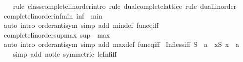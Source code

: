 \begin{isabellebody}
\ \ %
\endisadelimproof
%
\isatagproof
{}\isamarkupfalse%
\ {\isacharparenleft}{\kern0pt}rule\ class{\isachardot}{\kern0pt}complete{\isacharunderscore}{\kern0pt}linorder{\isachardot}{\kern0pt}intro{\isacharcomma}{\kern0pt}\ rule\ dual{\isacharunderscore}{\kern0pt}complete{\isacharunderscore}{\kern0pt}lattice{\isacharcomma}{\kern0pt}\ rule\ dual{\isacharunderscore}{\kern0pt}linorder{\isacharparenright}{\kern0pt}%
\endisatagproof
{\isafoldproof}%
%
\isadelimproof
\isanewline
%
\endisadelimproof
\isanewline
{}\isamarkupfalse%
\ complete{\isacharunderscore}{\kern0pt}linorder{\isacharunderscore}{\kern0pt}inf{\isacharunderscore}{\kern0pt}min{\isacharcolon}{\kern0pt}\ {\isachardoublequoteopen}inf\ {\isacharequal}{\kern0pt}\ min{\isachardoublequoteclose}\isanewline
%
\isadelimproof
\ \ %
\endisadelimproof
%
\isatagproof
{}\isamarkupfalse%
\ {\isacharparenleft}{\kern0pt}auto\ intro{\isacharcolon}{\kern0pt}\ order{\isachardot}{\kern0pt}antisym\ simp\ add{\isacharcolon}{\kern0pt}\ min{\isacharunderscore}{\kern0pt}def\ fun{\isacharunderscore}{\kern0pt}eq{\isacharunderscore}{\kern0pt}iff{\isacharparenright}{\kern0pt}%
\endisatagproof
{\isafoldproof}%
%
\isadelimproof
\isanewline
%
\endisadelimproof
\isanewline
{}\isamarkupfalse%
\ complete{\isacharunderscore}{\kern0pt}linorder{\isacharunderscore}{\kern0pt}sup{\isacharunderscore}{\kern0pt}max{\isacharcolon}{\kern0pt}\ {\isachardoublequoteopen}sup\ {\isacharequal}{\kern0pt}\ max{\isachardoublequoteclose}\isanewline
%
\isadelimproof
\ \ %
\endisadelimproof
%
\isatagproof
{}\isamarkupfalse%
\ {\isacharparenleft}{\kern0pt}auto\ intro{\isacharcolon}{\kern0pt}\ order{\isachardot}{\kern0pt}antisym\ simp\ add{\isacharcolon}{\kern0pt}\ max{\isacharunderscore}{\kern0pt}def\ fun{\isacharunderscore}{\kern0pt}eq{\isacharunderscore}{\kern0pt}iff{\isacharparenright}{\kern0pt}%
\endisatagproof
{\isafoldproof}%
%
\isadelimproof
\isanewline
%
\endisadelimproof
\isanewline
{}\isamarkupfalse%
\ Inf{\isacharunderscore}{\kern0pt}less{\isacharunderscore}{\kern0pt}iff{\isacharcolon}{\kern0pt}\ {\isachardoublequoteopen}{\isasymSqinter}S\ {\isacharless}{\kern0pt}\ a\ {\isasymlongleftrightarrow}\ {\isacharparenleft}{\kern0pt}{\isasymexists}x{\isasymin}S{\isachardot}{\kern0pt}\ x\ {\isacharless}{\kern0pt}\ a{\isacharparenright}{\kern0pt}{\isachardoublequoteclose}\isanewline
%
\isadelimproof
\ \ %
\endisadelimproof
%
\isatagproof
{}\isamarkupfalse%
\ {\isacharparenleft}{\kern0pt}simp\ add{\isacharcolon}{\kern0pt}\ not{\isacharunderscore}{\kern0pt}le\ {\isacharbrackleft}{\kern0pt}symmetric{\isacharbrackright}{\kern0pt}\ le{\isacharunderscore}{\kern0pt}Inf{\isacharunderscore}{\kern0pt}iff{\isacharparenright}{\kern0pt}%

\end{isabellebody}
